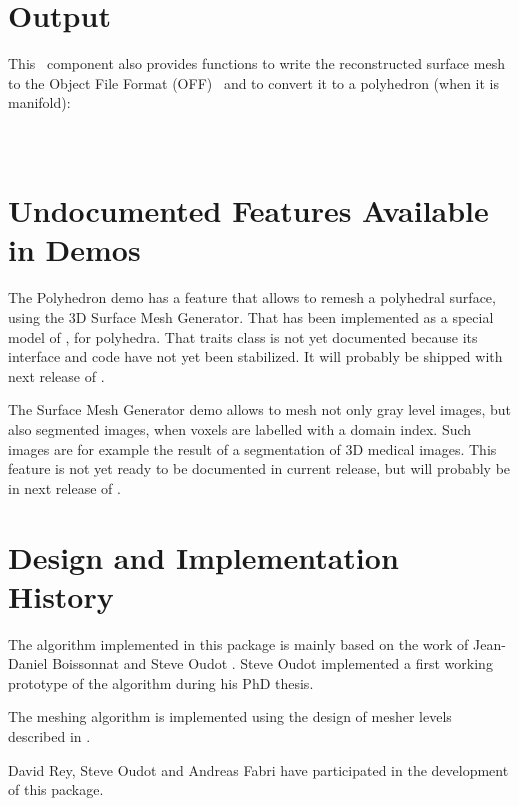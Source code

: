 \section{Output}

This \cgal\ component also provides functions to write the reconstructed surface mesh to the Object File Format (OFF)~\cite{cgal:p-gmgv16-96} and to convert it to a polyhedron (when it is manifold): \\
  \\
  \\

\section{Undocumented Features Available in Demos}

The Polyhedron demo has a feature that allows to remesh a polyhedral
surface, using the 3D Surface Mesh Generator. That has been implemented as
a special model of , for polyhedra. That traits
class is not yet documented because its interface and code have not yet
been stabilized. It will probably be shipped with next release of \cgal{}.

The Surface Mesh Generator demo allows to mesh not only gray level images,
but also segmented images, when voxels are labelled with a domain
index. Such images are for example the result of a segmentation of 3D
medical images. This feature is not yet ready to be documented in current
release, but will probably be in next release of \cgal{}.

\section{Design and Implementation History}

The algorithm implemented in this package is mainly based on the work of
Jean-Daniel Boissonnat and Steve Oudot \cite{cgal:bo-pgsms-05}.  Steve Oudot
implemented a first working prototype of the algorithm during his PhD thesis.

The meshing algorithm is implemented using the design of mesher levels
described in \cite{cgal:ry-gsddrm-06}.

David Rey, Steve Oudot and Andreas Fabri have participated
in the development of this package.
